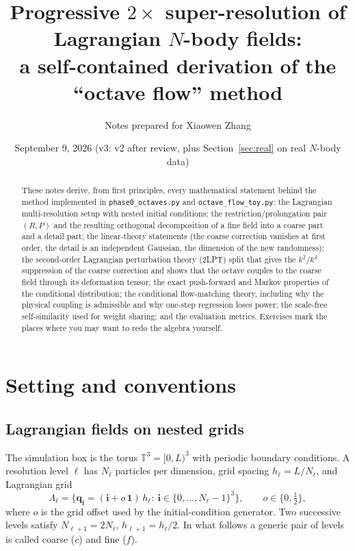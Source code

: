 \documentclass[11pt]{article}
\title{Progressive $2\times$ super-resolution of Lagrangian $N$-body fields:\\ a self-contained derivation of the ``octave flow'' method}
\author{Notes prepared for Xiaowen Zhang}
\date{September 9, 2026 (v3: v2 after review, plus Section~\ref{sec:real} on real $N$-body data)}
\theoremstyle{definition}
\newcommand{\q}{\mathbf{q}}
\begin{document}
\maketitle

\begin{abstract}
\noindent These notes derive, from first principles, every mathematical statement behind the method implemented in \texttt{phase0\_octaves.py} and \texttt{octave\_flow\_toy.py}: the Lagrangian multi-resolution setup with nested initial conditions; the restriction/prolongation pair $(R,P)$ and the resulting orthogonal decomposition of a fine field into a coarse part and a detail part; the linear-theory statements (the coarse correction vanishes at first order, the detail is an independent Gaussian, the dimension of the new randomness); the second-order Lagrangian perturbation theory (2LPT) split that gives the $k^{2}$/$k^{4}$ suppression of the coarse correction and shows that the octave couples to the coarse field through its deformation tensor; the exact push-forward and Markov properties of the conditional distribution; the conditional flow-matching theory, including why the physical coupling is admissible and why one-step regression loses power; the scale-free self-similarity used for weight sharing; and the evaluation metrics. Exercises mark the places where you may want to redo the algebra yourself.
\end{abstract}

\tableofcontents

\section{Setting and conventions}

\subsection{Lagrangian fields on nested grids}

The simulation box is the torus $\mathbb{T}^3=[0,L)^3$ with periodic boundary conditions. A resolution level $\ell$ has $N_\ell$ particles per dimension, grid spacing $h_\ell=L/N_\ell$, and Lagrangian grid
\begin{equation}
\Lambda_\ell=\{\q_{\mathbf i}=(\mathbf i+o\,\mathbf 1)\,h_\ell:\ \mathbf i\in\{0,\dots,N_\ell-1\}^3\},\qquad o\in\{0,\tfrac12\},
\end{equation}
where $o$ is the grid offset used by the initial-condition generator. Two successive levels satisfy $N_{\ell+1}=2N_\ell$, $h_{\ell+1}=h_\ell/2$. In what follows a generic pair of levels is called coarse ($c$) and fine ($f$).
\end{document}
